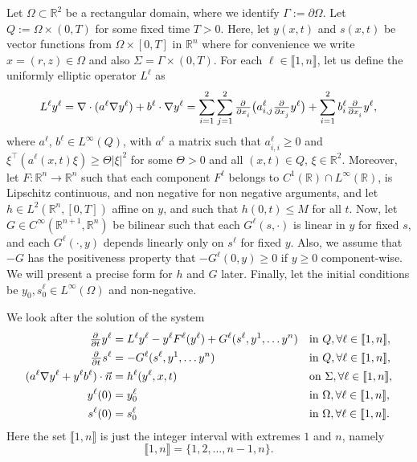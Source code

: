 \documentclass[11pt]{article}
\newcommand{\R}{\mathbb{R}}
\newcommand{\llb}{\llbracket}
\newcommand{\rrb}{\rrbracket}
\numberwithin{equation}{section}
\begin{document}
Let \(\Omega \subset \R^2\) be a rectangular domain, where we identify \(\Gamma := \partial \Omega\). Let \( Q := \Omega \times (0,T)\) for some fixed time \(T >0\).
Here, let \(y(x,t)\) and \(s(x,t)\) be vector functions from \(\Omega \times [0,T]\) in \(\R^{n}\) where for convenience we write \( x = (r,z) \in \Omega\) and also \(\Sigma = \Gamma \times (0,T)\). For each \(\ell \in \llb1,n\rrb\), let us define the uniformly elliptic operator \(L^\ell\) as
\[
	L^\ell y^\ell = \nabla \cdot (a^\ell \nabla y^\ell) + b^\ell \cdot \nabla y^\ell
	= \sum_{i=1}^{2}  \sum_{j=1}^2 \pd{ }{x_i} \big( a_{i,j}^\ell \pd{ }{x_j} y^\ell \big) + \sum_{i=1}^2 b_i^\ell \pd{ }{x_i} y^\ell,
\]
where \(a^\ell\), \(b^\ell \in L^\infty (Q)\), with \(a^\ell\) a matrix such that \(a^\ell_{i,i} \geq 0\) and
\(
	\xi^\top (a^\ell (x,t) \xi) \geq \Theta |\xi|^2
\)
for some \(\Theta > 0\) and all \((x,t) \in Q\), \( \xi \in \R^2\).
%
Moreover, let \(F: \R^n \to \R^n\) such that each component \( F^\ell \) belongs to \( C^1 (\R) \cap L^\infty (\R)\), is Lipschitz continuous, and non negative for non negative arguments, and let \(h\in L^2 (\R^n,[0,T]) \) affine on \(y\), and such that \(h(0,t) \leq M \) for all \(t\).
Now, let \(G \in C^\infty(\R^{n+1}, \R^n)\) be bilinear such that each \( G^\ell(s,\cdot)\) is linear in \( y\) for fixed \(s\), and each \( G^\ell (\cdot, y)\) depends linearly only on \( s^\ell\) for fixed \(y\). Also, we assume that \(-G\) has the positiveness property that \(-G^\ell (0, y) \geq 0\) if \( y\geq 0\) component-wise. We will present a precise form for \(h\) and \(G\) later.
Finally, let the initial conditions be \( y_0, s_0^\ell \in L^\infty (\Omega)\) and non-negative.

We look after the solution of the system
\begin{subequations}
\label{eq:pde-ode-sys-a}
\begin{align}
	\pd{ }{t} y^\ell &= L^\ell y^\ell - y^\ell F^\ell(y^\ell) + G^\ell(s^\ell,y^1,\ldots y^n) 		&& \text{in } Q, \forall \ell \in \llb 1,n\rrb,
	\\
	\label{sys:coupled-ode}
	\pd{ }{t} s^\ell &= -G^\ell(s^\ell,y^1,\ldots y^n)				&& \text{in } Q,\forall \ell \in \llb 1,n\rrb,
	\\
	 (a^\ell \nabla y^\ell + y^\ell b^\ell) \cdot \vec{n} &= h^\ell (y^\ell, x,t)	&& \text{on } \Sigma,\forall \ell \in \llb 1,n\rrb,
	 \label{eq:1.2.d}
	 \\
	 y^\ell(0) &= y^\ell_{0}			 && \text{in } \Omega, \forall \ell \in \llb 1,n\rrb,
	 \\
	 s^\ell(0) &= s^\ell_{0}			 && \text{in } \Omega, \forall \ell \in \llb 1,n\rrb.
\end{align}
\end{subequations}
Here the set \( \llb 1,n\rrb\) is just the integer interval with extremes \(1\) and \(n\), namely
\[
	\llb 1,n\rrb = \{1,2,\ldots, n-1, n\}.
\]
\end{document}

